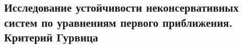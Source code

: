 

\subsection{Исследование устойчивости неконсервативных систем по уравнениям первого приближения. Критерий Гурвица}



